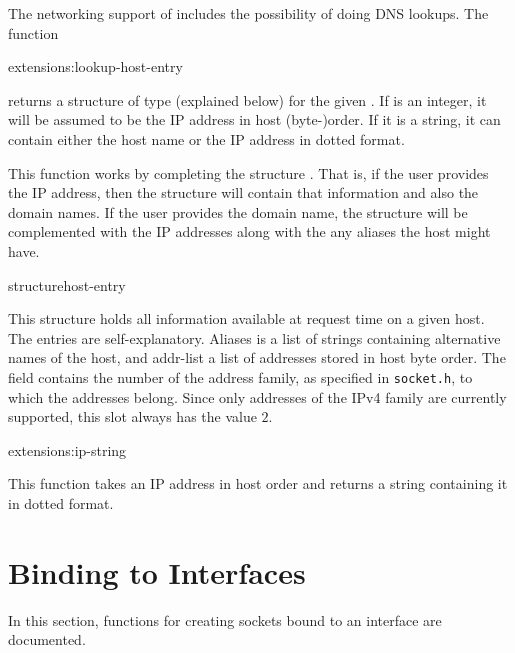 The networking support of \cmucl{} includes the possibility of doing
DNS lookups. The function 

\begin{defun}{extensions:}{lookup-host-entry}{%
    }
 
  returns a structure of type  (explained below) for
  the given .  If  is an integer, it will be
  assumed to be the IP address in host (byte-)order. If it is a string,
  it can contain either the host name or the IP address in dotted
  format.
  
  This function works by completing the structure .
  That is, if the user provides the IP address, then the structure will
  contain that information and also the domain names. If the user
  provides the domain name, the structure will be complemented with
  the IP addresses along with the any aliases the host might have.

\end{defun}

\newpage

\begin{deftp}{structure}{host-entry}
  
  This structure holds all information available at request time on a
  given host. The entries are self-explanatory. Aliases is a list of
  strings containing alternative names of the host, and addr-list a
  list of addresses stored in host byte order. The field
   contains the number of the address family, as
  specified in {\tt socket.h}, to which the addresses belong. Since
  only addresses of the IPv4 family are currently supported, this slot
  always has the value $2$.

\end{deftp}

\begin{defun}{extensions:}{ip-string}{%
    }
  
  This function takes an IP address in host order and returns a string
  containing it in dotted format.

\end{defun}

\section{Binding to Interfaces}

In this section, functions for creating sockets bound to an interface
are documented.

